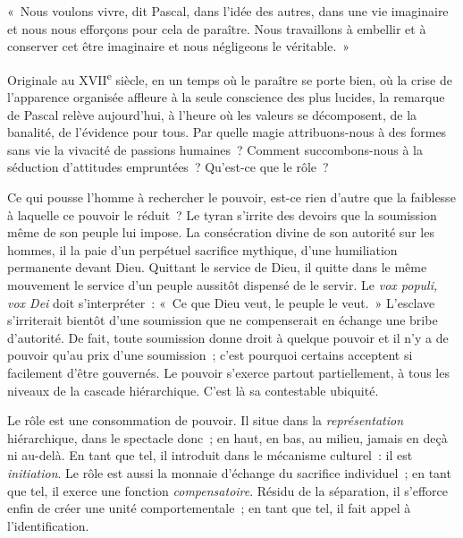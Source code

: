 \documentclass[french,twoside]{book} %
\newenvironment{quoteblock}%
  {\begin{quoting}}
  {\end{quoting}}
\newenvironment{quotebar}{%
    \def\FrameCommand{{\color{rubric!10!}\vrule width 0.5em} \hspace{0.9em}}%
    \def\OuterFrameSep{\itemsep} %
    \MakeFramed {\advance\hsize-\width \FrameRestore}
  }%
  {%
    \endMakeFramed
  }
\renewenvironment{quoteblock}%
  {%
    \savenotes
    \setstretch{0.9}
    \normalfont
    \begin{quotebar}
  }
  {%
    \end{quotebar}
    \spewnotes
  }
\begin{document}
\begin{quoteblock}
\noindent « Nous voulons vivre, dit Pascal, dans l’idée des autres, dans une vie imaginaire et nous nous efforçons pour cela de paraître. Nous travaillons à embellir et à conserver cet être imaginaire et nous négligeons le véritable. »\end{quoteblock}

\noindent Originale au XVII\textsuperscript{e} siècle, en un temps où le paraître se porte bien, où la crise de l’apparence organisée affleure à la seule conscience des plus lucides, la remarque de Pascal relève aujourd’hui, à l’heure où les valeurs se décomposent, de la banalité, de l’évidence pour tous. Par quelle magie attribuons-nous à des formes sans vie la vivacité de passions humaines ? Comment succombons-nous à la séduction d’attitudes empruntées ? Qu’est-ce que le rôle ?\par
Ce qui pousse l’homme à rechercher le pouvoir, est-ce rien d’autre que la faiblesse à laquelle ce pouvoir le réduit ? Le tyran s’irrite des devoirs que la soumission même de son peuple lui impose. La consécration divine de son autorité sur les hommes, il la paie d’un perpétuel sacrifice mythique, d’une humiliation permanente devant Dieu. Quittant le service de Dieu, il quitte dans le même mouvement le service d’un peuple aussitôt dispensé de le servir. Le \emph{vox populi, vox Dei} doit s’interpréter : « Ce que Dieu veut, le peuple le veut. » L’esclave s’irriterait bientôt d’une soumission que ne compenserait en échange une bribe d’autorité. De fait, toute soumission donne droit à quelque pouvoir et il n’y a de pouvoir qu’au prix d’une soumission ; c’est pourquoi certains acceptent si facilement d’être gouvernés. Le pouvoir s’exerce partout partiellement, à tous les niveaux de la cascade hiérarchique. C’est là sa contestable ubiquité.\par
Le rôle est une consommation de pouvoir. Il situe dans la \emph{représentation} hiérarchique, dans le spectacle donc ; en haut, en bas, au milieu, jamais en deçà ni au-delà. En tant que tel, il introduit dans le mécanisme culturel : il est \emph{initiation}. Le rôle est aussi la monnaie d’échange du sacrifice individuel ; en tant que tel, il exerce une fonction \emph{compensatoire}. Résidu de la séparation, il s’efforce enfin de créer une unité comportementale ; en tant que tel, il fait appel à l’identification.
\end{document}
